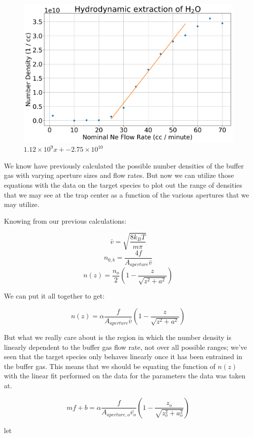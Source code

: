 \documentclass[a4paper]{article}
\begin{document}
\begin{figure}[H]
\centering
\includegraphics[width=1\textwidth]{CBGB_hydrodynamic_fit.png}
\caption{$1.12 \times 10^9 x + -2.75 \times 10^10$}
\label{f: rga}
\end{figure}

We know have previously calculated the possible number densities of the buffer gas with varying aperture sizes and flow rates. But now we can utilize those equations with the data on the target species to plot out the range of densities that we may see at the trap center as a function of the various apertures that we may utilize.

Knowing from our previous calculations:

$$ \bar{v} = \sqrt{\frac{8 k_B T}{m \pi}} $$
$$ n_{0,b}=\frac{4 f}{A_{aperture} \bar{v}} $$
$$n(z)=\frac{n_o}{2}\left(1-\frac{z}{\sqrt{z^2+a^2}}\right)$$

We can put it all together to get:

$$n(z)=\alpha\frac{f}{A_{aperture} \bar{v}}\left(1-\frac{z}{\sqrt{z^2+a^2}}\right)$$

But what we really care about is the region in which the number density is linearly dependent to the buffer gas flow rate, not over all possible ranges; we've seen that the target species only behaves linearly once it has been entrained in the buffer gas. This means that we should be equating the function of $n(z)$ with the linear fit performed on the data for the parameters the data was taken at.

$$mf+b = \alpha\frac{f}{A_{aperture, o} \bar{v_o}}\left(1-\frac{z_o}{\sqrt{z_o^2+a_o^2}}\right)$$

let
\end{document}
